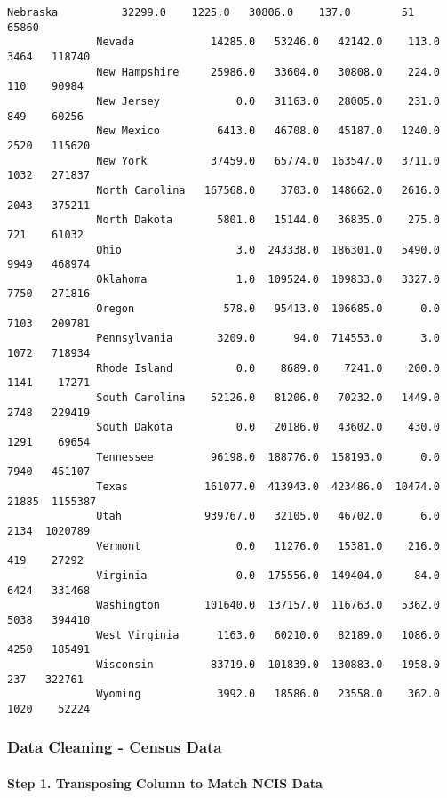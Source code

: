 \documentclass[11pt]{article}
\begin{document}
\begin{Verbatim}[commandchars=\\\{\}]
              Nebraska          32299.0    1225.0   30806.0    137.0        51    65860
              Nevada            14285.0   53246.0   42142.0    113.0      3464   118740
              New Hampshire     25986.0   33604.0   30808.0    224.0       110    90984
              New Jersey            0.0   31163.0   28005.0    231.0       849    60256
              New Mexico         6413.0   46708.0   45187.0   1240.0      2520   115620
              New York          37459.0   65774.0  163547.0   3711.0      1032   271837
              North Carolina   167568.0    3703.0  148662.0   2616.0      2043   375211
              North Dakota       5801.0   15144.0   36835.0    275.0       721    61032
              Ohio                  3.0  243338.0  186301.0   5490.0      9949   468974
              Oklahoma              1.0  109524.0  109833.0   3327.0      7750   271816
              Oregon              578.0   95413.0  106685.0      0.0      7103   209781
              Pennsylvania       3209.0      94.0  714553.0      3.0      1072   718934
              Rhode Island          0.0    8689.0    7241.0    200.0      1141    17271
              South Carolina    52126.0   81206.0   70232.0   1449.0      2748   229419
              South Dakota          0.0   20186.0   43602.0    430.0      1291    69654
              Tennessee         96198.0  188776.0  158193.0      0.0      7940   451107
              Texas            161077.0  413943.0  423486.0  10474.0     21885  1155387
              Utah             939767.0   32105.0   46702.0      6.0      2134  1020789
              Vermont               0.0   11276.0   15381.0    216.0       419    27292
              Virginia              0.0  175556.0  149404.0     84.0      6424   331468
              Washington       101640.0  137157.0  116763.0   5362.0      5038   394410
              West Virginia      1163.0   60210.0   82189.0   1086.0      4250   185491
              Wisconsin         83719.0  101839.0  130883.0   1958.0       237   322761
              Wyoming            3992.0   18586.0   23558.0    362.0      1020    52224
\end{Verbatim}
            
    \subsubsection{Data Cleaning - Census
Data}\label{data-cleaning---census-data}

\paragraph{Step 1. Transposing Column to Match NCIS
Data}\label{step-1.-transposing-column-to-match-ncis-data}
\end{document}
